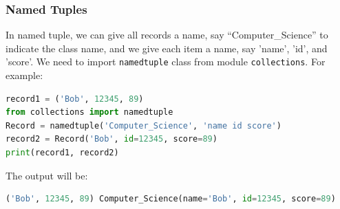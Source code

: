 \documentclass[../main.tex]{subfiles}
\begin{document}
\subsubsection{Named Tuples}In named tuple, we can give all records a name, say ``Computer\_Science'' to indicate the class name, and we give each item a name, say 'name', 'id', and 'score'. We need to import \texttt{namedtuple} class  from module \texttt{collections}. For example:
\begin{lstlisting}[language=Python]
record1 = ('Bob', 12345, 89)
from collections import namedtuple
Record = namedtuple('Computer_Science', 'name id score')
record2 = Record('Bob', id=12345, score=89)
print(record1, record2)
\end{lstlisting}
The output will be:
\begin{lstlisting}[language=Python]
('Bob', 12345, 89) Computer_Science(name='Bob', id=12345, score=89)
\end{lstlisting}
\end{document}
